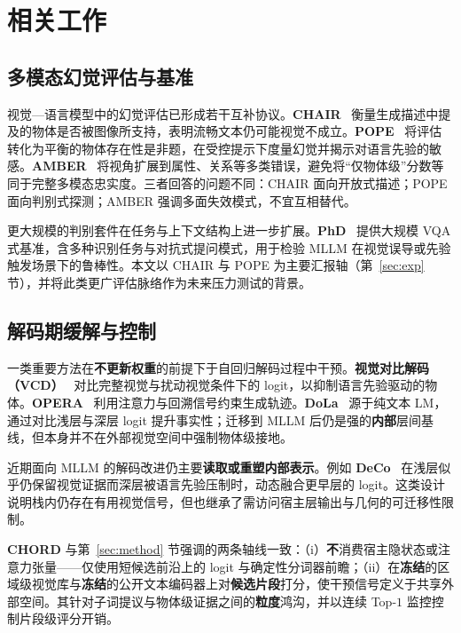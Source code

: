 \section{相关工作}
\label{sec:related}

\subsection{多模态幻觉评估与基准}

视觉—语言模型中的幻觉评估已形成若干互补协议。\textbf{CHAIR}~\cite{rohrbach2018chair} 衡量生成描述中提及的物体是否被图像所支持，表明流畅文本仍可能视觉不成立。\textbf{POPE}~\cite{li2023pope} 将评估转化为平衡的物体存在性是非题，在受控提示下度量幻觉并揭示对语言先验的敏感。\textbf{AMBER}~\cite{amber2023} 将视角扩展到属性、关系等多类错误，避免将``仅物体级''分数等同于完整多模态忠实度。三者回答的问题不同：CHAIR 面向开放式描述；POPE 面向判别式探测；AMBER 强调多面失效模式，不宜互相替代。

更大规模的判别套件在任务与上下文结构上进一步扩展。\textbf{PhD}~\cite{liu2025phd} 提供大规模 VQA 式基准，含多种识别任务与对抗式提问模式，用于检验 MLLM 在视觉误导或先验触发场景下的鲁棒性。本文以 CHAIR 与 POPE 为主要汇报轴（第~\ref{sec:exp} 节），并将此类更广评估脉络作为未来压力测试的背景。

\subsection{解码期缓解与控制}

一类重要方法在\textbf{不更新权重}的前提下于自回归解码过程中干预。\textbf{视觉对比解码（VCD）}~\cite{leng2024vcd} 对比完整视觉与扰动视觉条件下的 logit，以抑制语言先验驱动的物体。\textbf{OPERA}~\cite{huang2024opera} 利用注意力与回溯信号约束生成轨迹。\textbf{DoLa}~\cite{chuang2024dola} 源于纯文本 LM，通过对比浅层与深层 logit 提升事实性；迁移到 MLLM 后仍是强的\textbf{内部}层间基线，但本身并不在外部视觉空间中强制物体级接地。

近期面向 MLLM 的解码改进仍主要\textbf{读取或重塑内部表示}。例如 \textbf{DeCo}~\cite{wang2024deco} 在浅层似乎仍保留视觉证据而深层被语言先验压制时，动态融合更早层的 logit。这类设计说明栈内仍存在有用视觉信号，但也继承了需访问宿主层输出与几何的可迁移性限制。

\textbf{CHORD} 与第~\ref{sec:method} 节强调的两条轴线一致：（i）\textbf{不}消费宿主隐状态或注意力张量——仅使用短候选前沿上的 logit 与确定性分词器前瞻；（ii）在\textbf{冻结}的区域级视觉库与\textbf{冻结}的公开文本编码器上对\textbf{候选片段}打分，使干预信号定义于共享外部空间。其针对子词提议与物体级证据之间的\textbf{粒度}鸿沟，并以连续 Top-$1$ 监控控制片段级评分开销。

